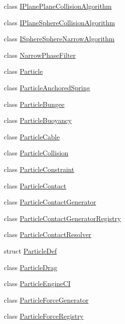 \begin{DoxyCompactItemize}
\item 
class \mbox{\hyperlink{classr3_1_1_i_plane_plane_collision_algorithm}{I\+Plane\+Plane\+Collision\+Algorithm}}
\item 
class \mbox{\hyperlink{classr3_1_1_i_plane_sphere_collision_algorithm}{I\+Plane\+Sphere\+Collision\+Algorithm}}
\item 
class \mbox{\hyperlink{classr3_1_1_i_sphere_sphere_narrow_algorithm}{I\+Sphere\+Sphere\+Narrow\+Algorithm}}
\item 
class \mbox{\hyperlink{classr3_1_1_narrow_phase_filter}{Narrow\+Phase\+Filter}}
\item 
class \mbox{\hyperlink{classr3_1_1_particle}{Particle}}
\item 
class \mbox{\hyperlink{classr3_1_1_particle_anchored_spring}{Particle\+Anchored\+Spring}}
\item 
class \mbox{\hyperlink{classr3_1_1_particle_bungee}{Particle\+Bungee}}
\item 
class \mbox{\hyperlink{classr3_1_1_particle_buoyancy}{Particle\+Buoyancy}}
\item 
class \mbox{\hyperlink{classr3_1_1_particle_cable}{Particle\+Cable}}
\item 
class \mbox{\hyperlink{classr3_1_1_particle_collision}{Particle\+Collision}}
\item 
class \mbox{\hyperlink{classr3_1_1_particle_constraint}{Particle\+Constraint}}
\item 
class \mbox{\hyperlink{classr3_1_1_particle_contact}{Particle\+Contact}}
\item 
class \mbox{\hyperlink{classr3_1_1_particle_contact_generator}{Particle\+Contact\+Generator}}
\item 
class \mbox{\hyperlink{classr3_1_1_particle_contact_generator_registry}{Particle\+Contact\+Generator\+Registry}}
\item 
class \mbox{\hyperlink{classr3_1_1_particle_contact_resolver}{Particle\+Contact\+Resolver}}
\item 
struct \mbox{\hyperlink{structr3_1_1_particle_def}{Particle\+Def}}
\item 
class \mbox{\hyperlink{classr3_1_1_particle_drag}{Particle\+Drag}}
\item 
class \mbox{\hyperlink{classr3_1_1_particle_engine_c_i}{Particle\+Engine\+CI}}
\item 
class \mbox{\hyperlink{classr3_1_1_particle_force_generator}{Particle\+Force\+Generator}}
\item 
class \mbox{\hyperlink{classr3_1_1_particle_force_registry}{Particle\+Force\+Registry}}

\end{DoxyCompactItemize}
